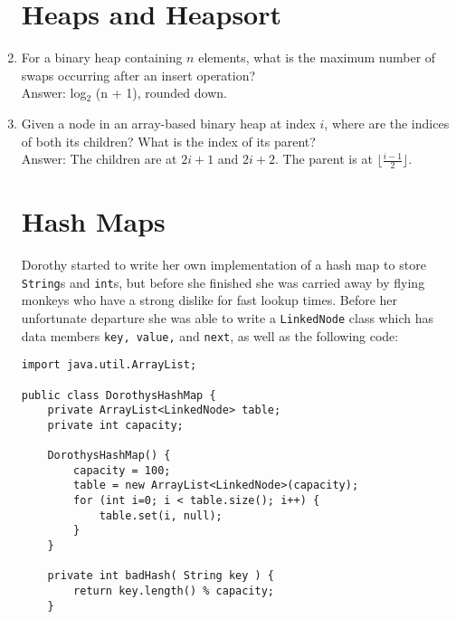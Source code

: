 \documentclass[11pt]{article}
\newenvironment{answer}{\large\lstset{basicstyle=\large}\color{white} \small{Answer:}\large}{}
\newenvironment{answer}{\large\lstset{basicstyle=\large}\color{red} \small{Answer:}\large}{}
\begin{document}
\begin{enumerate}
\section*{Heaps and Heapsort} %



\item For a binary heap containing $n$ elements, what is the maximum number of swaps occurring after an insert operation? \\
\begin{answer}
log$_{\textrm{2}}$ (n + 1), rounded down.
\end{answer}



\item Given a node in an array-based binary heap at index $i$, where are the indices of both its children? What is the index of its parent? \\
\begin{answer}
The children are at $2i+1$ and $2i+2$. The parent is at $\lfloor\frac{i-1}{2}\rfloor$.

\end{answer}


\newpage
\section*{Hash Maps}


Dorothy started to write her own implementation of a hash map to store {\tt String}s and {\tt int}s, but before she finished she was carried away by flying monkeys who have a strong dislike for fast lookup times. Before her unfortunate departure she was able to write a {\tt LinkedNode} class which has data members {\tt key, value,} and {\tt next}, as well as the following code:
\begin{lstlisting}
import java.util.ArrayList;

public class DorothysHashMap {
	private ArrayList<LinkedNode> table;
	private int capacity;
    
	DorothysHashMap() {
		capacity = 100;
		table = new ArrayList<LinkedNode>(capacity);
		for (int i=0; i < table.size(); i++) {
			table.set(i, null);
		}
	}
    
	private int badHash( String key ) {
		return key.length() % capacity;
	}
    

\end{lstlisting}
\end{enumerate}
\end{document}
